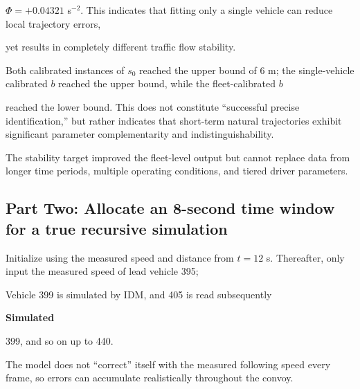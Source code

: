 \documentclass[11pt,a4paper,openany]{book}
\numberwithin{equation}{chapter}
\numberwithin{figure}{chapter}
\numberwithin{table}{chapter}
\begin{document}
$\Phi=+0.04321$ s$^{-2}$. This indicates that fitting only a single vehicle can reduce local trajectory errors,

yet results in completely different traffic flow stability.










\begin{tcolorbox}[notebox,title=\textbf{What does it mean when parameters reach their limits?}]

Both calibrated instances of $s_0$ reached the upper bound of 6 m; the single-vehicle calibrated $b$ reached the upper bound, while the fleet-calibrated $b$

reached the lower bound. This does not constitute “successful precise identification,” but rather indicates that short-term natural trajectories exhibit significant parameter complementarity and indistinguishability.

The stability target improved the fleet-level output but cannot replace data from longer time periods, multiple operating conditions, and tiered driver parameters.







\end{tcolorbox}

\subsection{Part Two: Allocate an 8-second time window for a true recursive simulation}










Initialize using the measured speed and distance from $t=12$ s. Thereafter, only input the measured speed of lead vehicle 395;

Vehicle 399 is simulated by IDM, and 405 is read subsequently




\textbf{Simulated}




399, and so on up to 440.

The model does not “correct” itself with the measured following speed every frame, so errors can accumulate realistically throughout the convoy.
\end{document}
